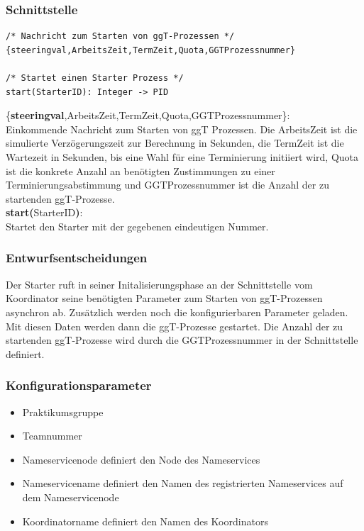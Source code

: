\documentclass{article}
\begin{document}
\subsubsection{Schnittstelle}
\begin{lstlisting}
/* Nachricht zum Starten von ggT-Prozessen */
{steeringval,ArbeitsZeit,TermZeit,Quota,GGTProzessnummer}

/* Startet einen Starter Prozess */
start(StarterID): Integer -> PID
\end{lstlisting}
\{\textbf{steeringval},ArbeitsZeit,TermZeit,Quota,GGTProzessnummer\}:\\
Einkommende Nachricht zum Starten von ggT
Prozessen. Die ArbeitsZeit ist die simulierte Verzögerungszeit zur Berechnung in Sekunden, die TermZeit ist die
Wartezeit in Sekunden, bis eine Wahl für eine Terminierung initiiert wird, Quota ist die konkrete Anzahl an
benötigten Zustimmungen zu einer Terminierungsabstimmung und GGTProzessnummer ist die Anzahl der zu startenden
ggT-Prozesse.\\

\textbf{start(}StarterID\textbf{)}:\\
Startet den Starter mit der gegebenen eindeutigen Nummer.\\

\subsubsection{Entwurfsentscheidungen}
Der Starter ruft in seiner Initalisierungsphase an der Schnittstelle vom Koordinator seine benötigten Parameter zum
Starten von ggT-Prozessen asynchron ab. Zusätzlich werden noch die konfigurierbaren Parameter geladen. Mit diesen Daten
werden dann die ggT-Prozesse gestartet. Die Anzahl der zu startenden ggT-Prozesse wird durch die GGTProzessnummer in der
Schnittstelle definiert.

\subsubsection{Konfigurationsparameter}
\begin{itemize}
    \item Praktikumsgruppe
    \item Teamnummer
    \item Nameservicenode definiert den Node des Nameservices
    \item Nameservicename definiert den Namen des registrierten Nameservices auf dem Nameservicenode
    \item Koordinatorname definiert den Namen des Koordinators
\end{itemize}
\end{document}
